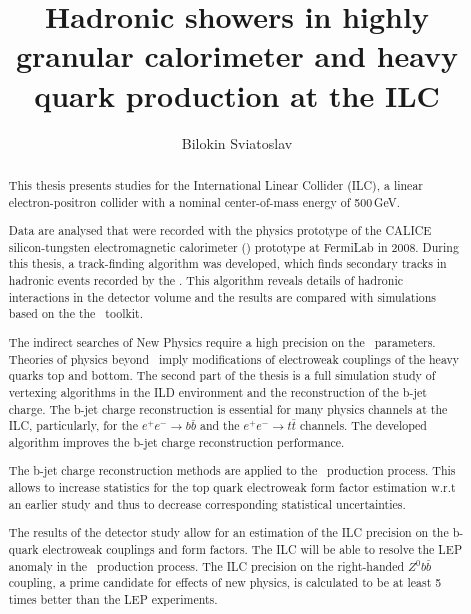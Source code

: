 \documentclass[a4paper, 12pt]{article}
\title{Hadronic showers in highly granular calorimeter and heavy quark production at the ILC}
\author{Bilokin Sviatoslav}
\begin{document}
\maketitle
\begin{abstract}

This thesis presents studies for the International Linear Collider (ILC), a linear electron-positron collider with a nominal center-of-mass energy of 500\,GeV.

Data are analysed that were recorded with the physics prototype of the CALICE silicon-tungsten electromagnetic calorimeter (\ecal) prototype at FermiLab in 2008. During this thesis, a track-finding algorithm was developed, which finds secondary tracks in hadronic events recorded by the \ecalp. This algorithm reveals details of hadronic interactions in the detector volume and the results are compared with simulations based on the the \geant\ toolkit.

The indirect searches of New Physics require a high precision on the \sm\ parameters. Theories of physics beyond \sm\ imply modifications of electroweak couplings of the heavy quarks top and bottom. The second part of the thesis is a full simulation study of vertexing algorithms in the ILD environment and the reconstruction of the b-jet charge. The b-jet charge reconstruction is essential for many physics channels at the ILC, particularly, for the $e^+e^-\to b\bar{b}$ and the $e^+e^-\to t\bar{t}$ channels.
The developed algorithm improves the b-jet charge reconstruction performance.

The b-jet charge reconstruction methods are applied to the \ttbar\ production process. This allows to increase statistics for the top quark electroweak form factor estimation w.r.t an earlier study and thus to decrease corresponding statistical uncertainties.

The results of the detector study allow for an estimation of the ILC precision on the b-quark electroweak couplings and form factors. The ILC will be able to resolve the LEP anomaly in the \bbbar\ production process. The ILC precision on the right-handed $Z^0b\bar{b}$ coupling, a prime candidate for effects of new physics, is calculated to be at least 5 times better than the LEP experiments. 
\end{abstract}
\tableofcontents
\linenumbers
\newpage
\end{document}
